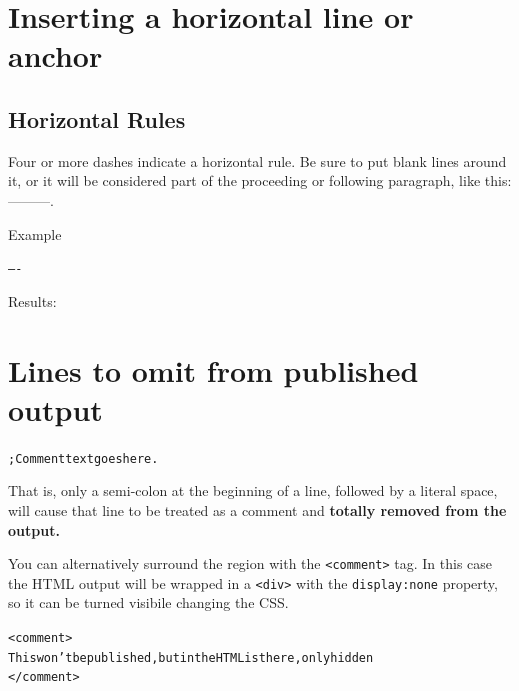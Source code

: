 \documentclass[DIV=12,%
               BCOR=0mm,%
               fontsize=10pt,%
               oneside,%
               paper=210mm:11in]{scrbook}
\newcommand*{\hairline}{%
  \bigskip%
  \noindent \hrulefill%
  \bigskip%
}
\begin{document}
\chapter{Inserting a horizontal line or anchor}

\section{Horizontal Rules}


Four or more dashes indicate a horizontal rule.  Be sure to put blank
lines around it, or it will be considered part of the proceeding or
following paragraph, like this: ---------.


Example


\begin{alltt}
----

\end{alltt}


Results:


\hairline

\chapter{Lines to omit from published output}


\begin{alltt}
; Comment text goes here.

\end{alltt}

That is, only a semi-colon at the beginning of a line, followed by a
literal space, will cause that line to be treated as a comment and
\textbf{totally removed from the output.}


You can alternatively surround the region with the \texttt{<comment>} tag. In
this case the HTML output will be wrapped in a \texttt{<div>} with the
\texttt{display:none} property, so it can be turned visibile changing the
CSS.


\begin{alltt}
<comment>
This won't be published, but in the HTML is there, only hidden
</comment>

\end{alltt}

\end{document}
